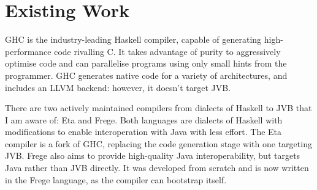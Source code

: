 \documentclass[dissertation.tex]{subfiles}
\begin{document}
\section{Existing Work}
{
    GHC is the industry-leading Haskell compiler, capable of generating high-performance code rivalling C. It takes advantage of purity to aggressively optimise code and can parallelise programs using only small hints from the programmer. GHC generates native code for a variety of architectures, and includes an LLVM backend: however, it doesn't target JVB.

    There are two actively maintained compilers from dialects of Haskell to JVB that I am aware of: Eta and Frege. Both languages are dialects of Haskell with modifications to enable interoperation with Java with less effort. The Eta compiler is a fork of GHC, replacing the code generation stage with one targeting JVB. Frege also aims to provide high-quality Java interoperability, but targets Java rather than JVB directly. It was developed from scratch and is now written in the Frege language, as the compiler can bootstrap itself. 
}
\end{document}
